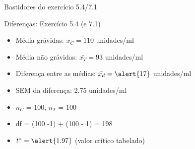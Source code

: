 \documentclass{beamer}
\begin{document}

\begin{frame}{\scriptsize Bastidores do exercício 5.4/7.1}
  \begin{exampleblock}{Diferenças: Exercício 5.4 (e 7.1)}
    \footnotesize
    \begin{exampleblock}{}
    \footnotesize
      \begin{itemize}
        \footnotesize
      \item {\scriptsize Média grávidas: $\bar{x_C} = 110$ unidades/ml}
      \item {\scriptsize Média não grávidas: $\bar{x_T} = 93$ unidades/ml}
      \item Diferença entre as médias: $\bar{x_d} = \alert{17}$ unidades/ml
      \end{itemize}
    \end{exampleblock}
    \begin{exampleblock}{}
    \footnotesize
      \begin{itemize}
        \footnotesize
      \item SEM da diferença: \alert{2.75} unidades/ml
      \end{itemize}
    \end{exampleblock}
    \begin{exampleblock}{}
    \footnotesize
      \begin{itemize}
        \footnotesize
      \item {\scriptsize $n_C$ = 100, $n_T$ = 100}
      \item df = (100 -1) + (100 - 1) = \alert{198}
      \end{itemize}
    \end{exampleblock}
    \begin{exampleblock}{}
    \footnotesize
      \begin{itemize}
        \footnotesize
      \item $t^{*} = \alert{1.97}$ {\tiny(valor crítico tabelado)}
      \end{itemize}
    \end{exampleblock}
  \end{exampleblock}
\end{frame}
\end{document}
